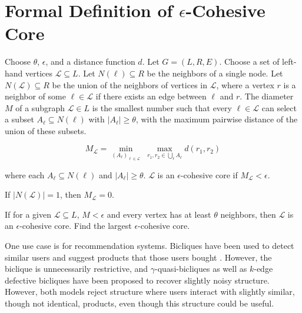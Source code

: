 \section{Formal Definition of $\epsilon$-Cohesive Core}

Choose $\theta$, $\epsilon$, and a distance function $d$. Let $G = (L, R, E)$. Choose a set of left-hand vertices $\mathcal{L} \subseteq L$. Let $N(\ell) \subseteq R$ be the neighbors of a single node. Let $N(\mathcal{L}) \subseteq R$ be the union of the neighbors of vertices in $\mathcal{L}$, where a vertex $r$ is a neighbor of some $\ell \in \mathcal{L}$ if there exists an edge between $\ell$ and $r$. The diameter $M$ of a subgraph $\mathcal{L} \in L$ is the smallest number such that every $\ell \in \mathcal{L}$ can select a subset $A_\ell \subseteq N(\ell)$ with
$|A_\ell| \ge \theta$, with the maximum pairwise distance of the union of these subsets.

$$M_\mathcal{L} = \min_{(A_\ell)_{\ell\in\mathcal{L}}} \; \max_{r_1,r_2 \in \bigcup_\ell A_\ell} d(r_1,r_2)$$

where each $A_\ell \subseteq N(\ell)$ and $|A_\ell|\ge\theta$. $\mathcal{L}$ is an $\epsilon$-cohesive core if $M_\mathcal{L} < \epsilon$.

If $|N(\mathcal{L})| = 1$, then $M_\mathcal{L} = 0$.

If for a given $\mathcal{L} \subseteq L$, $M < \epsilon$ and every vertex has at least $\theta$ neighbors, then $\mathcal{L}$ is an $\epsilon$-cohesive core. Find the largest $\epsilon$-cohesive core.

One use case is for recommendation systems. Bicliques have been used to detect similar users and suggest products that those users bought \cite{yao2022identifying}. However, the biclique is unnecessarily restrictive, and $\gamma$-quasi-bicliques \cite{sim2009mining} as well as $k$-edge defective bicliques \cite{cui2025efficient} have been proposed to recover slightly noisy structure. However, both models reject structure where users interact with slightly similar, though not identical, products, even though this structure could be useful.

